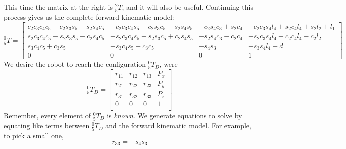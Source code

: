 \begin{ExampleCont}
This time the matrix at the right is $^2_5T$, and it will also be useful.
Continuing this process gives us the complete forward kinematic model:
\small{
\[
^0_5T =\left[
\begin{array}{cccc}
c_2c_3c_4c_5 - c_2s_3s_5 + s_2s_4c_5 & -c_2c_3c_4s_5-c_2s_3c_5-s_2s_4s_5 & -c_2s_4c_3+s_2c_4 & -c_2c_3s_4l_4+s_2c_4l_4+s_2l_2+l_1 \\
s_2c_3c_4c_5-s_2s_3s_5-c_2s_4c_5 & -s_2c_3c_4s_5-s_2s_3c_5+c_2s_4s_5 & -s_2s_4c_3-c_2c_4 & -s_2c_3s_4l_4-c_2c_4l_4-c_2l_2 \\
s_3c_4c_5+c_3s_5 & -s_3c_4s_5+c_3c_5 & -s_4s_3 & -s_3s_4l_4+d \\
0 & 0 & 0 & 1
\end{array} \right]
\]
}
%
%
%
%
We desire the robot to reach the configuration $^0_5T_D$, were
\[
^0_5T_D =
\left[
\begin{array}{cccc}
r_{11} & r_{12} & r_{13} & P_x \\
r_{21} & r_{22} & r_{23} & P_y \\
r_{31} & r_{32} & r_{33} & P_z \\
0&0&0&1\\
\end{array}
\right]
\]
Remember, every element of $^0_5T_D$ is {\it known}.   We generate equations to solve by equating like
terms between $^0_5T_D$ and the forward kinematic model.   For example, to pick a small one,
\[
r_{33} = -s_4s_3
\]


\end{ExampleCont}
